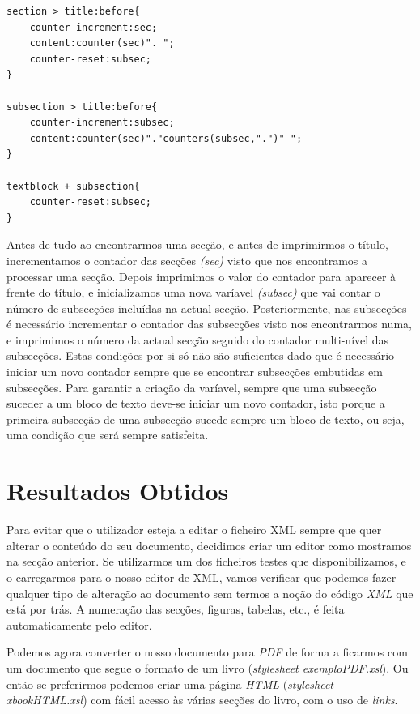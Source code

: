 \documentclass[a4paper]{article}
\begin{document}
\begin{small}
\begin{lstlisting}
section > title:before{
    counter-increment:sec;
    content:counter(sec)". ";
    counter-reset:subsec;
}

subsection > title:before{
    counter-increment:subsec;
    content:counter(sec)"."counters(subsec,".")" ";
}

textblock + subsection{
    counter-reset:subsec;
}
\end{lstlisting}
\end{small}

\hspace{1cm}Antes de tudo ao encontrarmos uma secção, e antes de imprimirmos o título, incrementamos o contador das secções \emph{(sec)} visto que nos encontramos a processar uma secção. Depois imprimimos o valor do contador para aparecer à frente do título, e inicializamos uma nova varíavel \emph{(subsec)} que vai contar o número de subsecções incluídas na actual secção. Posteriormente, nas subsecções é necessário incrementar o contador das subsecções visto nos encontrarmos numa, e imprimimos o número da actual secção seguido do contador multi-nível das subsecções. Estas condições por si só não são suficientes dado que é necessário iniciar um novo contador sempre que se encontrar subsecções embutidas em subsecções. Para garantir a criação da varíavel, sempre que uma subsecção suceder a um bloco de texto deve-se iniciar um novo contador, isto porque a primeira subsecção de uma subsecção sucede sempre um bloco de texto, ou seja, uma condição que será sempre satisfeita.

\newpage

\newpage
\section{\LARGE Resultados Obtidos}
\hspace{1cm}Para evitar que o utilizador esteja a editar o ficheiro XML sempre que quer alterar o conteúdo do seu documento, decidimos criar um editor como mostramos na secção anterior. Se utilizarmos um dos ficheiros testes que disponibilizamos, e o carregarmos para o nosso editor de XML, vamos verificar que podemos fazer qualquer tipo de alteração ao documento sem termos a noção do código {\em XML} que está por trás. A numeração das secções, figuras, tabelas, etc., é feita automaticamente pelo editor.

\hspace{1cm}Podemos agora converter o nosso documento para {\em PDF} de forma a ficarmos com um documento que segue o formato de um livro ({\em stylesheet exemploPDF.xsl}). Ou então se preferirmos podemos criar uma página {\em HTML} ({\em stylesheet xbookHTML.xsl}) com fácil acesso às várias secções do livro, com o uso de {\em links}.\\
\end{document}
